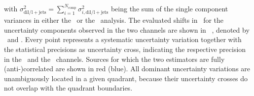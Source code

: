 %
with $\sigma_\mathrm{dil/l+jets}^2=\sum_{i=1}^{N_\mathrm{comp}} \sigma_{i,\mathrm{dil/l+jets}}^{2}$ being the sum of the single component variances in either the \dil\ or the \ljets\ analysis.
%
The evaluated shifts in \mt\ for the uncertainty components observed in the two channels are shown in \fig~, denoted by \dmtlj\ and \dmtdl. 
%
Every point represents a systematic uncertainty variation together with the statistical precisions as uncertainty cross, indicating the respective precision in the \dil\ and the \ljets\ channels. 
%
Sources for which the two estimators are fully (anti-)correlated are shown in red (blue).
%
All dominant uncertainty variations are unambiguously located in a given quadrant, because their uncertainty crosses do not overlap with the quadrant boundaries.
%
